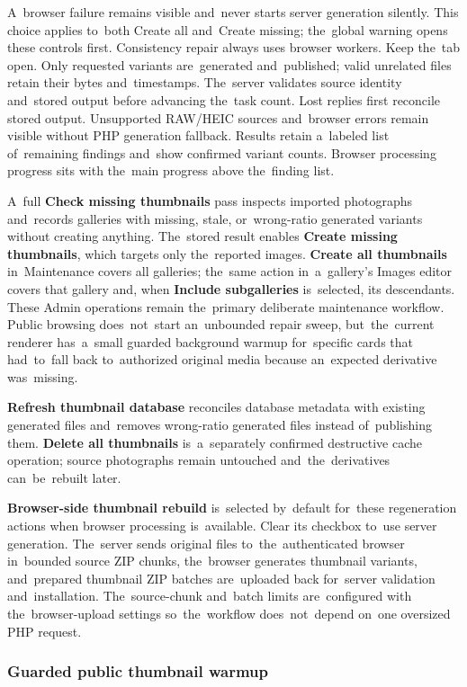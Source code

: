 \documentclass[11pt,a4paper]{article}
\newcommand{\ui}[1]{\textbf{#1}}
\begin{document}
A~browser failure remains visible and~never starts server generation silently.
This choice applies to~both Create all and~Create missing; the~global warning
opens these controls first. Consistency repair always uses browser workers.
Keep the~tab open. Only requested variants are~generated and~published;
valid unrelated files retain their bytes and~timestamps. The~server validates
source identity and~stored output before advancing the~task count. Lost
replies first reconcile stored output. Unsupported RAW/HEIC sources and~browser
errors remain visible without PHP generation fallback. Results retain a~labeled
list of~remaining findings and~show confirmed variant counts.
Browser processing progress sits with the~main progress above the~finding list.

A~full \ui{Check missing thumbnails} pass inspects imported photographs
and~records galleries with missing, stale, or~wrong-ratio generated variants
without creating anything. The~stored result enables \ui{Create missing
thumbnails}, which targets only the~reported images. \ui{Create all
thumbnails} in~Maintenance covers all galleries; the~same action
in~a~gallery's Images editor covers that gallery and, when \ui{Include
subgalleries} is~selected, its descendants. These Admin operations remain
the~primary deliberate maintenance workflow. Public browsing does~not~start
an~unbounded repair sweep, but~the~current renderer has~a~small guarded
background warmup for~specific cards that had~to~fall back to~authorized
original media because an~expected derivative was~missing.

\ui{Refresh thumbnail database} reconciles database metadata with existing
generated files and~removes wrong-ratio generated files instead of~publishing
them. \ui{Delete all thumbnails} is~a~separately confirmed destructive cache
operation; source photographs remain untouched and~the~derivatives
can~be~rebuilt later.

\ui{Browser-side thumbnail rebuild} is~selected by~default for~these
regeneration actions when browser processing is~available. Clear its checkbox
to~use server generation. The~server sends original files to~the~authenticated
browser in~bounded source ZIP chunks, the~browser generates thumbnail
variants, and~prepared thumbnail ZIP batches are~uploaded back for~server
validation and~installation. The~source-chunk and~batch limits are~configured
with the~browser-upload settings so~the~workflow does~not~depend on~one
oversized PHP request.

\subsubsection{Guarded public thumbnail warmup}
\end{document}
